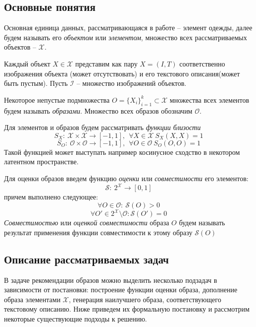 \documentclass[a4paper,14pt]{extarticle}
\begin{document}
		\subsection{Основные понятия}
			Основная единица данных, рассматривающаяся в работе -- элемент одежды, далее будем называть его \textit{объектом} или \textit{элементом}, множество всех рассматриваемых объектов -- $\mathcal{X}$. 
			
			Каждый объект $X\in\mathcal{X}$ представим как пару $X = (I, T)$ соответственно изображения объекта (может отсутствовать) и его текстового описания(может быть пустым). Пусть $\mathcal{I}$ -- множество изображений объектов.
			
			Некоторое непустые подмножества $O = \{X_i\}_{i=1}^k\subset \mathcal{X}$ множества всех элементов будем называть \textit{образами}.
			Множество всех образов обозначим $\mathcal{O}$.
		    
			Для элементов и образов будем рассматривать \textit{функции близости}
				$$S_X:~\mathcal{X}\times \mathcal{X}\longrightarrow [-1,1], ~~\forall X\in\mathcal{X}~S_X(X,X) = 1$$
				$$S_O:~\mathcal{O}\times \mathcal{O}\longrightarrow [-1,1], ~~\forall O\in\mathcal{O}~S_O(O,O) = 1$$
			Такой функцией может выступать например косинусное сходство в некотором латентном пространстве.
				
			Для оценки образов введем функцию \textit{оценки} или \textit{совместимости} его элементов: 
			$$\mathcal{S}:~2^\mathcal{X}\longrightarrow [0,1]$$
			 причем выполнено следующее:
			$$\forall O \in \mathcal{O}:~\mathcal{S}(O) > 0$$
			$$\forall O' \in 2^\mathcal{X} \setminus \mathcal{O}: \mathcal{S}(O') =0$$
			\textit{Совместимостью} или \textit{оценкой совместимости} образа $O$ будем называть результат применения функции совместимости к этому образу $\mathcal{S}(O)$
			
		\subsection{Описание рассматриваемых задач}
			В задаче рекомендации образов можно выделить несколько подзадач в зависимости от постановки: построение функции оценки образа, 
			дополнение образа элементами $\mathcal{X}$, генерация наилучшего образа, соответствующего текстовому описанию. Ниже приведем их формальную постановку и рассмотрим некоторые существующие подходы к решению.
\end{document}
